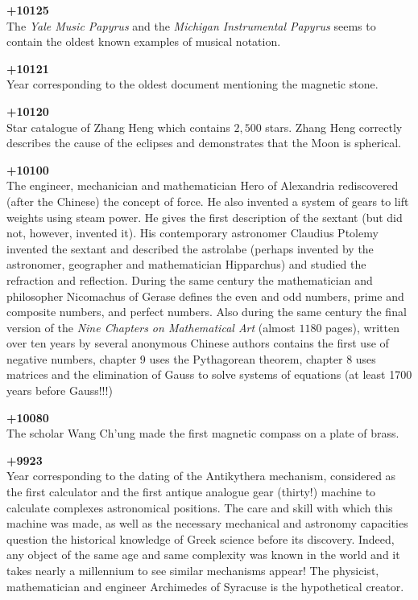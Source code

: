 \textbf{+10125}\\
The \textit{Yale Music Papyrus} and the \textit{Michigan Instrumental Papyrus} seems to contain the oldest known examples of musical notation.

\textbf{+10121}\\
Year corresponding to the oldest document mentioning the magnetic stone.

\textbf{+10120}\\
Star catalogue of Zhang Heng which contains $2,500$ stars. Zhang Heng correctly describes the cause of the eclipses and demonstrates that the Moon is spherical.

\textbf{+10100}\\
The engineer, mechanician and mathematician Hero of Alexandria rediscovered (after the Chinese) the concept of force. He also invented a system of gears to lift weights using steam power. He gives the first description of the sextant (but did not, however, invented it). His contemporary astronomer Claudius Ptolemy invented the sextant and described the astrolabe (perhaps invented by the astronomer, geographer and mathematician Hipparchus) and studied the refraction and reflection. During the same century the mathematician and philosopher Nicomachus of Gerase defines the even and odd numbers, prime and composite numbers, and perfect numbers. Also during the same century the final version of the \textit{Nine Chapters on Mathematical Art} (almost $1180$ pages), written over ten years by several anonymous Chinese authors contains the first use of negative numbers, chapter 9 uses the Pythagorean theorem, chapter 8 uses matrices and the elimination of Gauss to solve systems of equations (at least 1700 years before Gauss!!!)

\textbf{+10080}\\
The scholar Wang Ch'ung made the first magnetic compass on a plate of brass.

\textbf{+9923}\\
Year corresponding to the dating of the Antikythera mechanism, considered as the first calculator and the first antique analogue gear (thirty!) machine to calculate complexes astronomical positions. The care and skill with which this machine was made, as well as the necessary mechanical and astronomy capacities question the historical knowledge of Greek science before its discovery. Indeed, any object of the same age and same complexity was known in the world and it takes nearly a millennium to see similar mechanisms appear! The physicist, mathematician and engineer Archimedes of Syracuse is the hypothetical creator.

